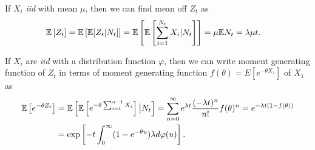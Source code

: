 \documentclass[a4paper,english,10pt]{article}
\begin{document}
\begin{exmp} If $X_i$ \emph{iid} with mean $\mu$, then we can find mean off $Z_t$ as
\begin{align*}
 \mathbb{E}\left[Z_t\right] = \mathbb{E}\left[\mathbb{E}[Z_t|N_t]\right]&=\mathbb{E}\left[\mathbb{E}\left[\sum_{i=1}^{N_t}X_i|N_t\right]\right] = \mu\mathbb{E} N_t = \lambda \mu t.
\end{align*}
\end{exmp}

\begin{exmp}  If $X_i$ are \emph{iid} with a distribution function $\varphi$, then we can write moment generating function of $Z_t$ in terms of moment generating function $f(\theta) = E[e^{-\theta X_1}]$ of $X_1$ as
\begin{align*}
\mathbb{E}\left[e^{-\theta Z_t}\right] &= \mathbb{E}\left[\mathbb{E}\left[e^{-\theta\sum_{i=1}^{n-1}X_i}\right]\big|N_t\right] 
= \sum_{n=0}^{\infty}e^{\lambda t}\frac{(-\lambda t)^n}{n!}f(\theta)^n
= e^{-\lambda t (1-f(\theta))}\\
&= \exp\left[-t\int_{0}^{\infty}(1-e^{-\theta u})\lambda d\varphi(u)\right].
\end{align*}
\end{exmp}
\end{document}
